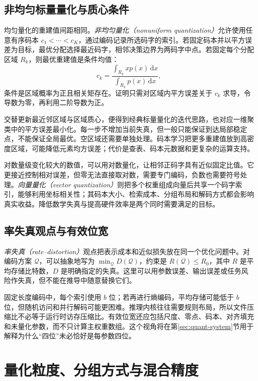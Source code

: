 \documentclass[UTF8,12pt,a4paper,fontset=fandol]{ctexart}
\begin{document}
\subsection{非均匀标量量化与质心条件}
均匀量化的重建值间距相同。\emph{非均匀量化（nonuniform quantization）}允许使用任意有序码本 $c_1<\cdots<c_K$，通过编码记录所选码字的索引。若固定码本并以平方误差为目标，最优分配选择最近码字，相邻决策边界为两码字中点。若固定每个分配区域 $R_k$，则最优重建值是条件均值：
\begin{equation}
 c_k=\frac{\int_{R_k}x p(x)\,\mathrm dx}{\int_{R_k}p(x)\,\mathrm dx},
 \label{eq:quant-centroid}
\end{equation}
条件是区域概率为正且相关矩存在。证明只需对区域内平方误差关于 $c_k$ 求导，令导数为零，再利用二阶导数为正。

交替更新最近邻区域与区域质心，便得到经典标量量化的迭代思路，也对应一维聚类中的平方误差最小化。每一步不增加当前失真，但一般只能保证到达局部稳定点，不能保证全局最优。空区域还需要单独处理。码本学习把更多重建值放到高密度区域，可能降低元素均方误差；代价是查表、码本元数据和更复杂的运算支持。

对数量级变化较大的数值，可以用对数量化，让相邻正码字具有近似固定比值。它更接近控制相对误差，但零无法直接取对数，需要专门编码，负数也需要符号处理。\emph{向量量化（vector quantization）}则把多个权重组成向量后共享一个码字索引，能够利用坐标相关性；其码本大小、检索成本、分组布局和解码方式都会影响真实收益。降低数学失真与提高硬件效率是两个同时需要满足的目标。

\subsection{率失真观点与有效位宽}
\emph{率失真（rate--distortion）}观点把表示成本和近似损失放在同一个优化问题中。对编码方案 $\mathcal Q$，可以抽象地写为 $\min_{\mathcal Q}D(\mathcal Q)$，约束是 $R(\mathcal Q)\leq R_0$，其中 $R$ 是平均存储比特数，$D$ 是明确指定的失真。这里可以用参数误差、输出误差或任务风险作失真，但不能在推导中随意替换它们。

固定长度编码中，每个索引使用 $b$ 位；若再进行熵编码，平均存储可能低于 $b$ 位，但随机访问和并行解码可能更困难。推理内核往往需要规则布局，所以文件压缩比不必等于运行时访存压缩比。有效位宽还应包括尺度、零点、码本、对齐填充和未量化参数，而不只计算主权重数组。这个视角将在第\ref{sec:quant-system}节用于解释为什么“四位”未必恰好是每参数四位。

\section{量化粒度、分组方式与混合精度}
\label{sec:quant-granularity}
\end{document}
